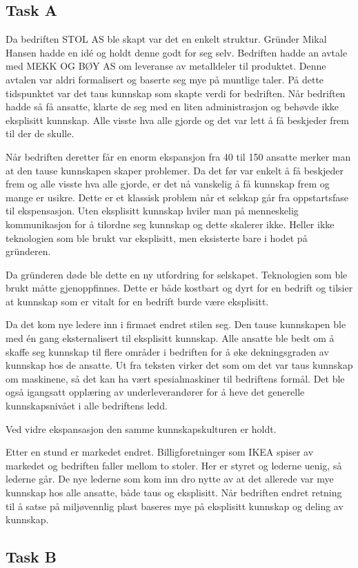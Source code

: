 \subsection{Task A}
Da bedriften STOL AS ble skapt var det en enkelt struktur.
Gründer Mikal Hansen hadde en idé og holdt denne godt for seg selv.
Bedriften hadde an avtale med MEKK OG BØY AS om leveranse av metalldeler til produktet. Denne avtalen var aldri formalisert og baserte seg mye på muntlige taler.
På dette tidspunktet var det taus kunnskap som skapte verdi for bedriften.
Når bedriften hadde så få ansatte, klarte de seg med en liten administrasjon og behøvde ikke eksplisitt kunnskap. Alle visste hva alle gjorde og det var lett å få beskjeder frem til der de skulle.

Når bedriften deretter får en enorm ekspansjon fra 40 til 150 ansatte merker man at den tause kunnskapen skaper problemer. Da det før var enkelt å få beskjeder frem og alle visste hva alle gjorde, er det nå vanskelig å få kunnskap frem og mange er usikre.
Dette er et klassisk problem når et selskap går fra oppstartsfase til ekspensasjon.
Uten eksplisitt kunnskap hviler man på menneskelig kommunikasjon for å tilordne seg kunnskap og dette skalerer ikke.
Heller ikke teknologien som ble brukt var eksplisitt, men eksisterte bare i hodet på gründeren.

Da gründeren døde ble dette en ny utfordring for selskapet. Teknologien som ble brukt måtte gjenoppfinnes.
Dette er både kostbart og dyrt for en bedrift og tilsier at kunnskap som er vitalt for en bedrift burde være eksplisitt.

Da det kom nye ledere inn i firmaet endret stilen seg. Den tause kunnskapen ble med én gang eksternalisert til eksplisitt kunnskap.
Alle ansatte ble bedt om å skaffe seg kunnskap til flere områder i bedriften for å øke dekningsgraden av kunnskap hos de ansatte.
Ut fra teksten virker det som om det var taus kunnskap om maskinene, så det kan ha vært spesialmaskiner til bedriftens formål.
Det ble også igangsatt opplæring av underleverandører for å heve det generelle kunnskapsnivået i alle bedriftens ledd.

Ved vidre ekspansasjon den samme kunnskapskulturen er holdt.

Etter en stund er markedet endret. Billigforetninger som IKEA spiser av markedet og bedriften faller mellom to stoler. Her er styret og lederne uenig, så lederne går.
De nye lederne som kom inn dro nytte av at det allerede var mye kunnskap hos alle ansatte, både taus og eksplisitt.
Når bedriften endret retning til å satse på miljøvennlig plast baseres mye på eksplisitt kunnskap og deling av kunnskap.

\subsection{Task B}

